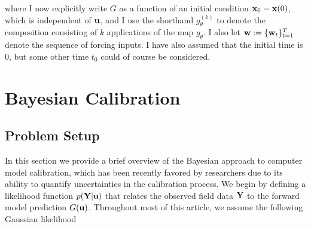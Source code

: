 \documentclass[12pt]{article}
\begin{document}
 where I now explicitly write $G$ as a function of an initial condition $\mathbf{x}_0 = \mathbf{x}(0)$, which is independent of $\mathbf{u}$, and I use the shorthand $g_\theta^{(k)}$ to denote 
 the composition consisting of $k$ applications of the map $g_\theta$. I also let $\mathbf{w} := \{\mathbf{w}_t\}_{t = 1}^{T}$ denote the sequence of forcing inputs. 
 I have also assumed that the initial time is $0$, but some other time $t_0$ could of course be considered. 

\section{Bayesian Calibration}

\subsection{Problem Setup}
In this section we provide a brief overview of the Bayesian approach to computer model calibration, which has been recently favored by researchers due to its ability to quantify 
uncertainties in the calibration process. We begin by defining a likelihood function $p(\mathbf{Y}|\mathbf{u})$ that relates the observed field data $\mathbf{Y}$ to the forward model prediction 
$G(\mathbf{u})$. Throughout most of this article, we assume the following Gaussian likelihood 
\end{document}
